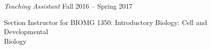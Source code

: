 \documentclass[10pt]{article}
\begin{document}
\textit{Teaching Assistant}%
    \hfill Fall 2016 -- Spring 2017\\
    \vspace{-1\baselineskip}
    \begin{innerlist}
        \item Section Instructor for BIOMG 1350: Introductory Biology: Cell and Developmental\\ Biology
    \end{innerlist}
\end{document}
